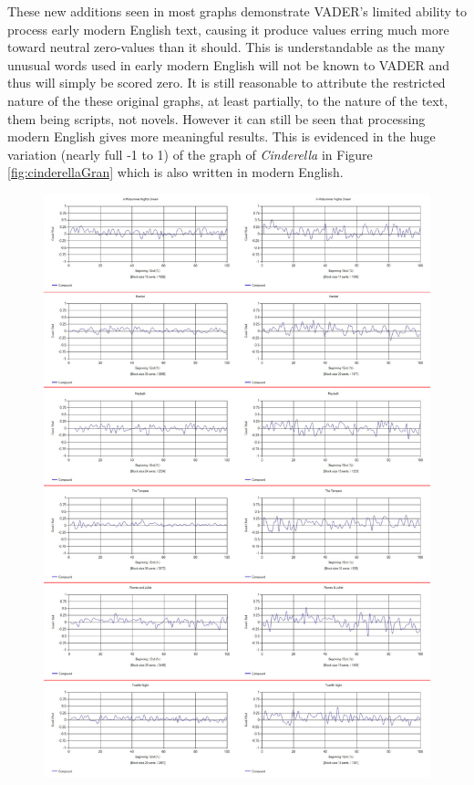 \documentclass{article}
\begin{document}
{        These new additions seen in most graphs demonstrate VADER's limited ability to process early modern English text, causing it produce values erring much more toward neutral zero-values than it should. This is understandable as the many unusual words used in early modern English will not be known to VADER and thus will simply be scored zero. It is still reasonable to attribute the restricted nature of the these original graphs, at least partially, to the nature of the text, them being scripts, not novels. However it can still be seen that processing modern English gives more meaningful results. This is evidenced in the huge variation (nearly full -1 to 1) of the graph of \textit{Cinderella} in Figure \ref{fig:cinderellaGran} which is also written in modern English.
        \begin{figure}
            \includegraphics[width=1\textwidth]{Figures/EMvsM/EMvsMAll}

\end{figure}}
\end{document}
